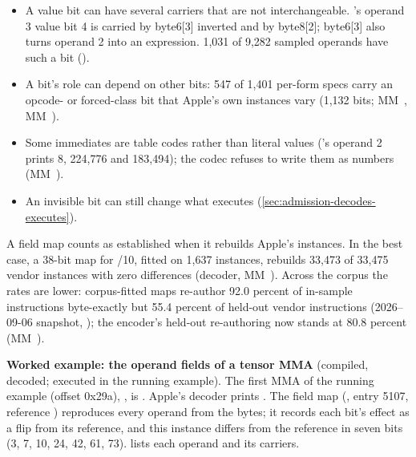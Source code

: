 \begin{itemize}
\item A value bit can have several carriers that are not interchangeable. 's operand 3 value bit 4 is carried by
  byte6{[}3{]} inverted and by byte8{[}2{]}; byte6{[}3{]} also turns operand 2 into an expression. 1,031 of 9,282 sampled operands
  have such a bit ().
\item A bit's role can depend on other bits: 547 of 1,401 per-form specs carry an opcode- or forced-class bit that Apple's
  own instances vary (1,132 bits; MM~, MM~).
\item Some immediates are table codes rather than literal values ('s operand 2 prints 8, 224,776 and 183,494); the codec refuses to write them as numbers (MM~).
\item An invisible bit can still change what executes (\cref{sec:admission-decodes-executes}).
\end{itemize}

A field map counts as established when it rebuilds Apple's instances. In the best case, a 38-bit map for /10, fitted on 1,637 instances, rebuilds 33,473 of 33,475 vendor instances with zero
differences (decoder, MM~). Across the corpus the rates are lower: corpus-fitted maps re-author 92.0 percent of in-sample
instructions byte-exactly but 55.4 percent of held-out vendor instructions (2026–09-06 snapshot,
); the encoder's held-out re-authoring now stands at 80.8 percent (MM~).

\textbf{Worked example: the operand fields of a tensor MMA} (compiled, decoded; executed in the running example). The first MMA of
the running example (offset 0x29a), , is
. Apple's decoder prints
. The field map
(, entry 5107, reference ) reproduces every operand from the
bytes; it records each bit's effect as a flip from its reference, and this instance differs from the reference in seven
bits (3, 7, 10, 24, 42, 61, 73).  lists each operand and its carriers.

